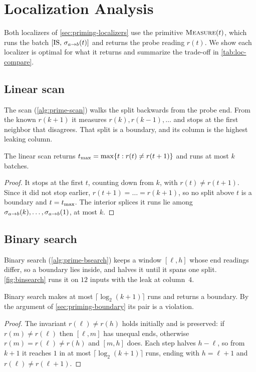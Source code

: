 \chapter{Localization Analysis}
\label{appendix:localization}

Both localizers of \autoref{sec:priming-localizers} use the primitive $\textsc{Measure}(t)$, which
runs the batch $[\mathrm{IS},\,\sigma_{a\to b}(t)]$ and returns the probe reading $r(t)$. We show each localizer is
optimal for what it returns and summarize the trade-off in \autoref{tab:loc-compare}.

\section{Linear scan}
\label{app:loc-scan}

The scan (\autoref{alg:prime-scan}) walks the split backwards from the probe end. From the known
$r(k+1)$ it measures $r(k),r(k-1),\dots$ and stops at the first neighbor that disagrees. That split
is a boundary, and its column is the highest leaking column.

\begin{proposition}
\label{prop:scancost}
The linear scan returns $t_{\max}=\max\{t:r(t)\neq r(t+1)\}$ and runs at most $k$ batches.
\end{proposition}
\begin{proof}
It stops at the first $t$, counting down from $k$, with $r(t)\neq r(t+1)$. Since it did not stop
earlier, $r(t+1)=\dots=r(k+1)$, so no split above $t$ is a boundary and $t=t_{\max}$. The interior
splices it runs lie among $\sigma_{a\to b}(k),\dots,\sigma_{a\to b}(1)$, at most $k$.
\end{proof}

\section{Binary search}
\label{app:loc-bsearch}

Binary search (\autoref{alg:prime-bsearch}) keeps a window $[\ell,h]$ whose end readings differ, so
a boundary lies inside, and halves it until it spans one split. \autoref{fig:binsearch} runs it on
$12$ inputs with the leak at column~$4$.

\begin{proposition}
\label{prop:bsearch}
Binary search makes at most $\lceil\log_2(k+1)\rceil$ runs and returns a boundary. By the argument
of \autoref{sec:priming-boundary} its pair is a violation.
\end{proposition}
\begin{proof}
The invariant $r(\ell)\neq r(h)$ holds initially and is preserved: if $r(m)\neq r(\ell)$ then
$[\ell,m]$ has unequal ends, otherwise $r(m)=r(\ell)\neq r(h)$ and $[m,h]$ does. Each step halves
$h-\ell$, so from $k+1$ it reaches $1$ in at most $\lceil\log_2(k+1)\rceil$ runs, ending with
$h=\ell+1$ and $r(\ell)\neq r(\ell+1)$.
\end{proof}

